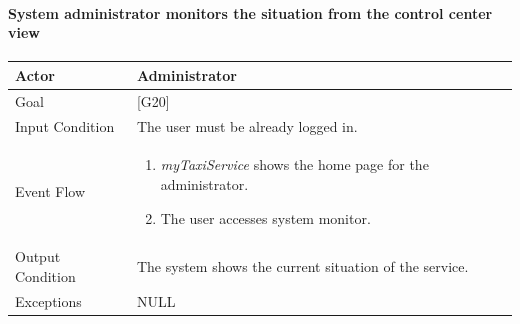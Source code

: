 \documentclass[a4paper,11pt]{report} %
\newcommand{\mts}{\mbox{\normalfont\itshape myTaxiService}}
\begin{document}
		\noindent%
		\begin{minipage}{\linewidth}
			\vspace*{-0.7cm}
		\end{minipage}	
	
	\pagebreak
	
	\paragraph{System administrator monitors the situation from the control center view}
	\begin{center}
		\begin{tabular}{| l | p{9cm} |}\hline
			Actor & Administrator\\\hline
			Goal & {[}G20{]} \\\hline
			Input Condition & The user must be already logged in.\\\hline
			Event Flow & \begin{enumerate}
				\item \mts{} shows the home page for the administrator.
				\item The user accesses system monitor.	
			\end{enumerate}\\\hline
			Output Condition & The system shows the current situation of the service.\\\hline
			Exceptions & NULL\\\hline
		\end{tabular}
	\end{center}
	
\end{document}
